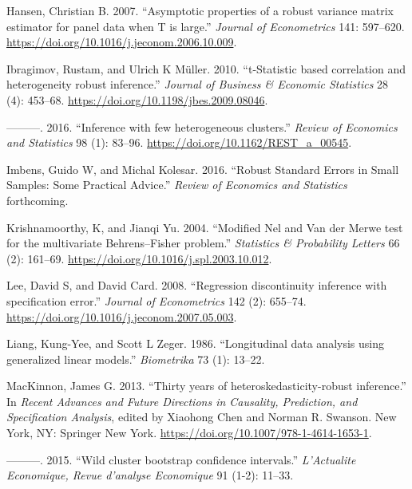 \documentclass[12pt]{article}
\newlength{\cslhangindent}
\newlength{\cslentryspacingunit} %
\newenvironment{CSLReferences}[2] %
 {%
  \setlength{\parindent}{0pt}
  \ifodd #1
  \let\oldpar\par
  \def\par{\hangindent=\cslhangindent\oldpar}
  \fi
  \setlength{\parskip}{#2\cslentryspacingunit}
 }%
 {}
\begin{document}
\begin{CSLReferences}{1}{0}
\leavevmode{}%
Hansen, Christian B. 2007. {``{Asymptotic properties of a robust
variance matrix estimator for panel data when T is large}.''}
\emph{Journal of Econometrics} 141: 597--620.
\url{https://doi.org/10.1016/j.jeconom.2006.10.009}.

\leavevmode{}%
Ibragimov, Rustam, and Ulrich K Müller. 2010. {``{t-Statistic based
correlation and heterogeneity robust inference}.''} \emph{Journal of
Business \& Economic Statistics} 28 (4): 453--68.
\url{https://doi.org/10.1198/jbes.2009.08046}.

\leavevmode{}%
---------. 2016. {``{Inference with few heterogeneous clusters}.''}
\emph{Review of Economics and Statistics} 98 (1): 83--96.
\url{https://doi.org/10.1162/REST_a_00545}.

\leavevmode{}%
Imbens, Guido W, and Michal Kolesar. 2016. {``{Robust Standard Errors in
Small Samples: Some Practical Advice}.''} \emph{Review of Economics and
Statistics} forthcoming.

\leavevmode{}%
Krishnamoorthy, K, and Jianqi Yu. 2004. {``{Modified Nel and Van der
Merwe test for the multivariate Behrens--Fisher problem}.''}
\emph{Statistics {\&} Probability Letters} 66 (2): 161--69.
\url{https://doi.org/10.1016/j.spl.2003.10.012}.

\leavevmode{}%
Lee, David S, and David Card. 2008. {``{Regression discontinuity
inference with specification error}.''} \emph{Journal of Econometrics}
142 (2): 655--74. \url{https://doi.org/10.1016/j.jeconom.2007.05.003}.

\leavevmode{}%
Liang, Kung-Yee, and Scott L Zeger. 1986. {``{Longitudinal data analysis
using generalized linear models}.''} \emph{Biometrika} 73 (1): 13--22.

\leavevmode{}%
MacKinnon, James G. 2013. {``{Thirty years of heteroskedasticity-robust
inference}.''} In \emph{Recent Advances and Future Directions in
Causality, Prediction, and Specification Analysis}, edited by Xiaohong
Chen and Norman R. Swanson. New York, NY: Springer New York.
\url{https://doi.org/10.1007/978-1-4614-1653-1}.

\leavevmode{}%
---------. 2015. {``{Wild cluster bootstrap confidence intervals}.''}
\emph{L'Actualite Economique, Revue d'analyse Economique} 91 (1-2):
11--33.


\end{CSLReferences}
\end{document}
